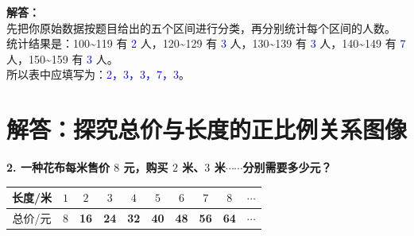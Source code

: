 {\small\color{gray}
\textbf{解答：}\\
先把你原始数据按题目给出的五个区间进行分类，再分别统计每个区间的人数。\\
统计结果是：100\textasciitilde119 有 \textcolor{blue}{2} 人，120\textasciitilde129 有 \textcolor{blue}{3} 人，130\textasciitilde139 有 \textcolor{blue}{3} 人，140\textasciitilde149 有 \textcolor{blue}{7} 人，150\textasciitilde159 有 \textcolor{blue}{3} 人。\\
所以表中应填写为：\textcolor{blue}{2，3，3，7，3}。
}


\newpage



\section{解答：探究总价与长度的正比例关系图像}

\vspace{0.6cm}

\noindent\textbf{2. 一种花布每米售价 $8$ 元，购买 $2$ 米、$3$ 米$\cdots\cdots$分别需要多少元？}

\vspace{0.3cm}
\begin{center}
\renewcommand{\arraystretch}{1.5}
\begin{tabular}{|c|c|c|c|c|c|c|c|c|c|}
\hline
长度/米 & $1$ & $2$ & $3$ & $4$ & $5$ & $6$ & $7$ & $8$ & $\cdots$ \\
\hline
总价/元 & $8$ 
  & \textcolor{blue!80!black}{\textbf{16}}
  & \textcolor{blue!80!black}{\textbf{24}}
  & \textcolor{blue!80!black}{\textbf{32}}
  & \textcolor{blue!80!black}{\textbf{40}}
  & \textcolor{blue!80!black}{\textbf{48}}
  & \textcolor{blue!80!black}{\textbf{56}}
  & \textcolor{blue!80!black}{\textbf{64}}
  & $\cdots$ \\
\hline
\end{tabular}
\end{center}

\vspace{0.6cm}

